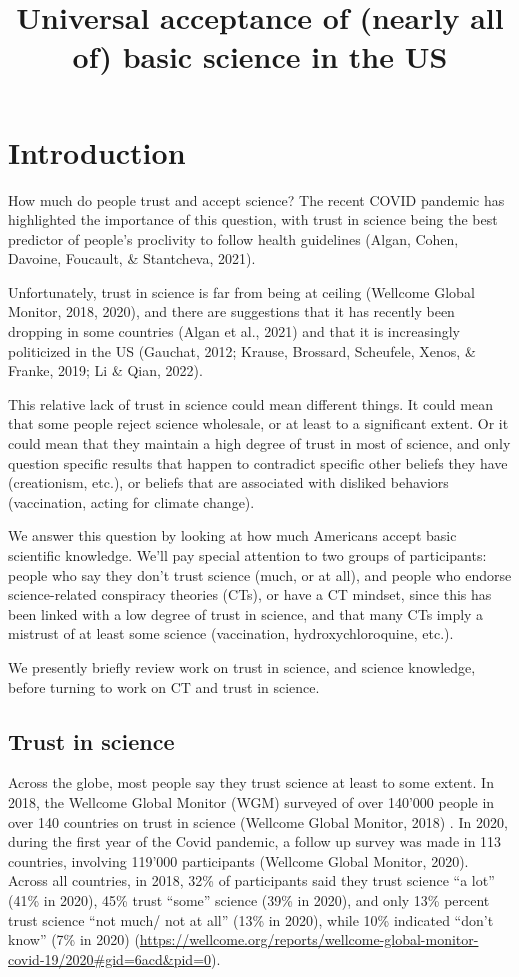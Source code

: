 \documentclass[
  doc,floatsintext]{apa6}
\title{Universal acceptance of (nearly all of) basic science in the US}
\author{\textsuperscript{}}
\date{}
\affiliation{\vspace{0.5cm}\textsuperscript{} }
\begin{document}
\maketitle

\section{Introduction}\label{introduction}

How much do people trust and accept science? The recent COVID pandemic has highlighted the importance of this question, with trust in science being the best predictor of people's proclivity to follow health guidelines (Algan, Cohen, Davoine, Foucault, \& Stantcheva, 2021).

Unfortunately, trust in science is far from being at ceiling (Wellcome Global Monitor, 2018, 2020), and there are suggestions that it has recently been dropping in some countries (Algan et al., 2021) and that it is increasingly politicized in the US (Gauchat, 2012; Krause, Brossard, Scheufele, Xenos, \& Franke, 2019; Li \& Qian, 2022).

This relative lack of trust in science could mean different things. It could mean that some people reject science wholesale, or at least to a significant extent. Or it could mean that they maintain a high degree of trust in most of science, and only question specific results that happen to contradict specific other beliefs they have (creationism, etc.), or beliefs that are associated with disliked behaviors (vaccination, acting for climate change).

We answer this question by looking at how much Americans accept basic scientific knowledge. We'll pay special attention to two groups of participants: people who say they don't trust science (much, or at all), and people who endorse science-related conspiracy theories (CTs), or have a CT mindset, since this has been linked with a low degree of trust in science, and that many CTs imply a mistrust of at least some science (vaccination, hydroxychloroquine, etc.).

We presently briefly review work on trust in science, and science knowledge, before turning to work on CT and trust in science.

\subsection{Trust in science}\label{trust-in-science}

Across the globe, most people say they trust science at least to some extent. In 2018, the Wellcome Global Monitor (WGM) surveyed of over 140'000 people in over 140 countries on trust in science (Wellcome Global Monitor, 2018) . In 2020, during the first year of the Covid pandemic, a follow up survey was made in 113 countries, involving 119'000 participants (Wellcome Global Monitor, 2020). Across all countries, in 2018, 32\% of participants said they trust science ``a lot'' (41\% in 2020), 45\% trust ``some'' science (39\% in 2020), and only 13\% percent trust science ``not much/ not at all'' (13\% in 2020), while 10\% indicated ``don't know'' (7\% in 2020) (\url{https://wellcome.org/reports/wellcome-global-monitor-covid-19/2020\#gid=6acd&pid=0}).
\end{document}
